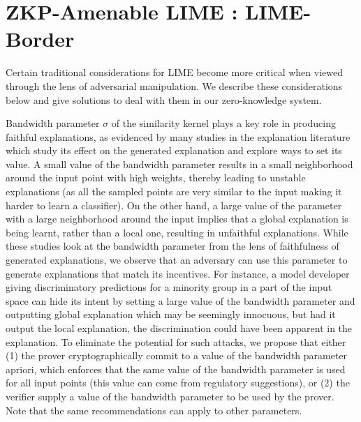 \section{ZKP-Amenable LIME : LIME-Border}\label{sec:advlime}


Certain traditional considerations for LIME become more critical when viewed through the lens of adversarial manipulation. We describe these considerations below and give solutions to deal with them in our zero-knowledge system.

Bandwidth parameter $\sigma$ of the similarity kernel plays a key role in producing faithful explanations, as evidenced by many studies in the explanation literature which study its effect on the generated explanation and explore ways to set its value. A small value of the bandwidth parameter results in a small neighborhood around the input point with high weights, thereby leading to unstable explanations (as all the sampled points are very similar to the input making it harder to learn a classifier). On the other hand, a large value of the parameter with a large neighborhood around the input implies that a global explanation is being learnt, rather than a local one, resulting in unfaithful explanations. While these studies look at the bandwidth parameter from the lens of faithfulness of generated explanations, we observe that an adversary can use this parameter to generate explanations that match its incentives. For instance, a model developer giving discriminatory predictions for a minority group in a part of the input space can hide its intent by setting a large value of the bandwidth parameter and outputting global explanation which may be seemingly innocuous, but had it output the local explanation, the discrimination could have been apparent in the explanation. To eliminate the potential for such attacks, we propose that either (1) the prover cryptographically commit to a value of the bandwidth parameter apriori, which enforces that the same value of the bandwidth parameter is used for all input points (this value can come from regulatory suggestions), or (2) the verifier supply a value of the bandwidth parameter to be used by the prover. Note that the same recommendations can apply to other parameters.

